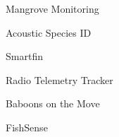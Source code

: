 \item Mangrove Monitoring
\item Acoustic Species ID
\item Smartfin
\item Radio Telemetry Tracker
\item Baboons on the Move
\item FishSense
